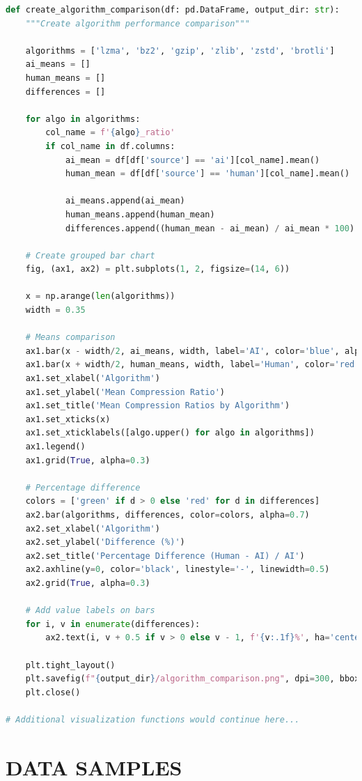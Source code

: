 \documentclass[12pt,a4paper]{report}
\begin{document}
\begin{lstlisting}[language=Python, caption=Visualization Generation]
def create_algorithm_comparison(df: pd.DataFrame, output_dir: str):
    """Create algorithm performance comparison"""

    algorithms = ['lzma', 'bz2', 'gzip', 'zlib', 'zstd', 'brotli']
    ai_means = []
    human_means = []
    differences = []

    for algo in algorithms:
        col_name = f'{algo}_ratio'
        if col_name in df.columns:
            ai_mean = df[df['source'] == 'ai'][col_name].mean()
            human_mean = df[df['source'] == 'human'][col_name].mean()

            ai_means.append(ai_mean)
            human_means.append(human_mean)
            differences.append((human_mean - ai_mean) / ai_mean * 100)

    # Create grouped bar chart
    fig, (ax1, ax2) = plt.subplots(1, 2, figsize=(14, 6))

    x = np.arange(len(algorithms))
    width = 0.35

    # Means comparison
    ax1.bar(x - width/2, ai_means, width, label='AI', color='blue', alpha=0.7)
    ax1.bar(x + width/2, human_means, width, label='Human', color='red', alpha=0.7)
    ax1.set_xlabel('Algorithm')
    ax1.set_ylabel('Mean Compression Ratio')
    ax1.set_title('Mean Compression Ratios by Algorithm')
    ax1.set_xticks(x)
    ax1.set_xticklabels([algo.upper() for algo in algorithms])
    ax1.legend()
    ax1.grid(True, alpha=0.3)

    # Percentage difference
    colors = ['green' if d > 0 else 'red' for d in differences]
    ax2.bar(algorithms, differences, color=colors, alpha=0.7)
    ax2.set_xlabel('Algorithm')
    ax2.set_ylabel('Difference (%)')
    ax2.set_title('Percentage Difference (Human - AI) / AI')
    ax2.axhline(y=0, color='black', linestyle='-', linewidth=0.5)
    ax2.grid(True, alpha=0.3)

    # Add value labels on bars
    for i, v in enumerate(differences):
        ax2.text(i, v + 0.5 if v > 0 else v - 1, f'{v:.1f}%', ha='center')

    plt.tight_layout()
    plt.savefig(f"{output_dir}/algorithm_comparison.png", dpi=300, bbox_inches='tight')
    plt.close()

# Additional visualization functions would continue here...

\end{lstlisting}

\chapter{DATA SAMPLES}
\end{document}
